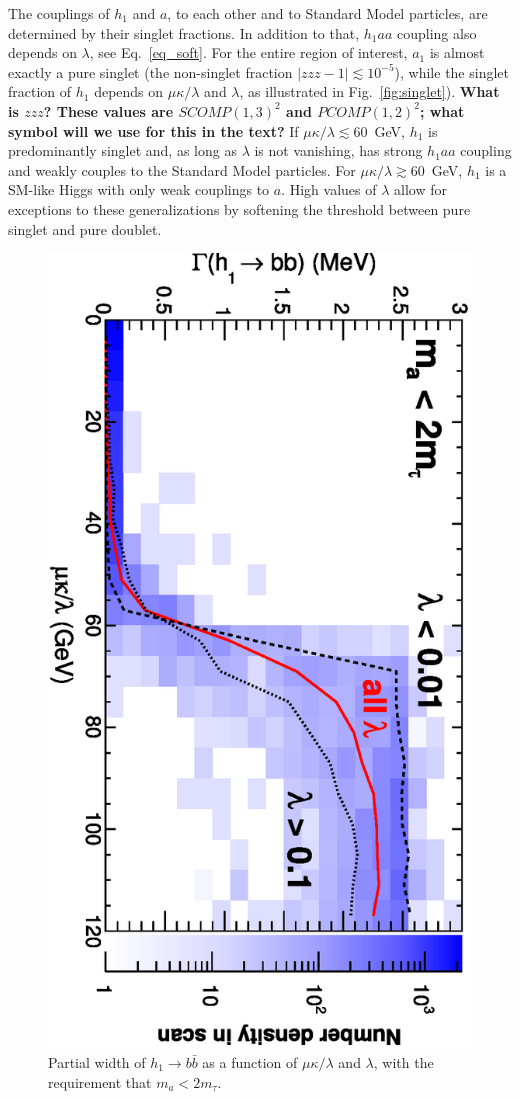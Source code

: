 \documentclass[aps,prl,twocolumn,nofootinbib,superscriptaddress]{revtex4}
\begin{document}
The couplings of $h_1$ and $a$, to each other and to Standard Model
particles, are determined by their singlet fractions. In addition 
to that, $h_1 aa$ coupling also depends on $\lambda$, see Eq.~\ref{eq_soft}.  
For the entire region of interest, $a_1$ is almost exactly a pure singlet 
(the non-singlet fraction $|zzz - 1| \lesssim 10^{-5}$), while the singlet 
fraction of $h_1$ depends on $\mu\kappa/\lambda$ and $\lambda$, as
illustrated in Fig.~\ref{fig:singlet}).  {\bf What
  is $zzz$?  These values are $SCOMP(1,3)^2$ and $PCOMP(1,2)^2$; what
  symbol will we use for this in the text?}  If $\mu\kappa/\lambda
\lesssim 60$~GeV, $h_1$ is predominantly singlet and, as long as $\lambda$
is not vanishing, has strong $h_1 aa$ coupling and weakly couples to the 
Standard Model particles.  For $\mu\kappa/\lambda \gtrsim 60$~GeV, $h_1$ 
is a SM-like Higgs with only weak couplings to $a$.  High values of 
$\lambda$ allow for exceptions to these generalizations by softening 
the threshold between pure singlet and pure doublet.


\begin{figure}
\centering
\includegraphics[height=0.75\linewidth, angle=90]{plots/newbranching/gammabb_vs_mkoverl.eps}

\caption{Partial width of $h_1 \to b\bar{b}$ as a function of
  $\mu\kappa/\lambda$ and $\lambda$, with the requirement that $m_a < 2m_\tau$. \label{fig:sm_mukoverl1}}
\end{figure}
\end{document}
